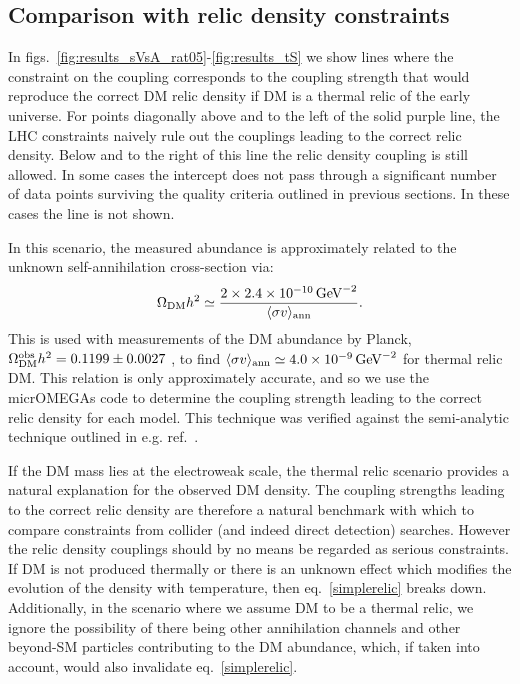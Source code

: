 \subsection{Comparison with relic density constraints}


In figs.~\ref{fig:results_sVsA_rat05}-\ref{fig:results_tS} we show lines where the constraint on the coupling corresponds to the coupling strength that would reproduce the correct DM relic density if DM is a thermal relic of the early universe. For points diagonally above and to the left of the solid purple line, the LHC constraints naively rule out the couplings leading to the correct relic density. Below and to the right of this line the relic density coupling is still allowed. In some cases the intercept does not pass through a significant number of data points surviving the quality criteria outlined in previous sections. In these cases the line is not shown.

In this scenario, the measured abundance is approximately related to the unknown self-annihilation cross-section via:
%
\begin{equation}
  \Omega_{\rm DM}h^2\simeq \frac{2\times2.4\times 10^{-10}\,{\rm GeV}^{-2}}{\langle\sigma v\rangle_{\rm ann}}.
  \label{simplerelic}
\end{equation}
%
This is used with measurements of the DM abundance by Planck, $\Omega_{\rm DM}^{\rm obs}h^2=0.1199\pm0.0027$ \cite{Ade:2013zuv}, to find $\langle\sigma v\rangle_{\rm ann}\simeq 4.0\times 10^{-9}\,{\rm GeV}^{-2}$ for thermal relic DM.
%
This relation is only approximately accurate, and so we use the micrOMEGAs code \cite{Belanger:2014vza} to determine the coupling strength leading to the correct relic density for each model. This technique was verified against the semi-analytic technique outlined in e.g. ref.~\cite{Busoni:2014gta}.

If the DM mass lies at the electroweak scale, the thermal relic scenario provides a natural explanation for the observed DM density. The coupling strengths leading to the correct relic density are therefore a natural benchmark with which to compare constraints from collider (and indeed direct detection) searches. However the relic density couplings should by no means be regarded as serious constraints. If DM is not produced thermally or there is an unknown effect which modifies the evolution of the density with temperature, then eq.~\ref{simplerelic} breaks down. Additionally, in the scenario where we assume DM to be a thermal relic, we ignore the possibility of there being other annihilation channels and other beyond-SM particles contributing to the DM abundance, which, if taken into account, would also invalidate eq.~\ref{simplerelic}.

